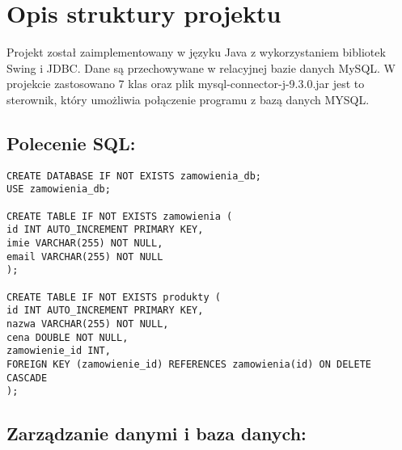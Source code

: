 \chapter{Opis struktury projektu}
\label{cha:Opis struktury projektu}

Projekt został zaimplementowany w języku Java z wykorzystaniem bibliotek Swing i JDBC. Dane są przechowywane w relacyjnej bazie danych MySQL.
W projekcie zastosowano 7 klas oraz plik mysql-connector-j-9.3.0.jar jest to sterownik, który umożliwia połączenie programu z bazą danych MYSQL.


\section{Polecenie SQL:}
\label{sec:Polecenie SQL:}

\begin{lstlisting}
CREATE DATABASE IF NOT EXISTS zamowienia_db;
USE zamowienia_db;

CREATE TABLE IF NOT EXISTS zamowienia (
id INT AUTO_INCREMENT PRIMARY KEY,
imie VARCHAR(255) NOT NULL,
email VARCHAR(255) NOT NULL
);

CREATE TABLE IF NOT EXISTS produkty (
id INT AUTO_INCREMENT PRIMARY KEY,
nazwa VARCHAR(255) NOT NULL,
cena DOUBLE NOT NULL,
zamowienie_id INT,
FOREIGN KEY (zamowienie_id) REFERENCES zamowienia(id) ON DELETE CASCADE
);
\end{lstlisting}


\section{Zarządzanie danymi i baza danych:}
\label{sec:Zarządzanie danymi i baza danych:}


